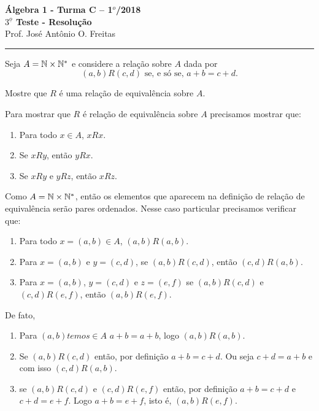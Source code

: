 \documentclass[12pt]{article}
\begin{document}


\begin{center}
{\Large\bf {\'A}lgebra 1 - Turma C -- 1$^{o}$/2018} \\ \vspace{9pt} {\large\bf
  $3^{\underline{o}}$ Teste - Resolu\c{c}\~ao}\\
\vspace{9pt} Prof. Jos{\'e} Ant{\^o}nio O. Freitas
\end{center}
\hrule

\vspace{.6cm}

\questao Seja $A = \mathbb{N} \times \mathbb{N}^*$ e considere a rela\c{c}\~ao sobre $A$ dada por
\[
	(a,b)R(c,d) \mbox{ se, e s\'o se, } a + b = c + d.
\]

Mostre que $R$ \'e uma rela\c{c}\~ao de equival\^encia sobre $A$.

Para mostrar que $R$ \'e rela\c{c}\~ao de equival\^encia sobre $A$ precisamos mostrar que:
\begin{enumerate}[label={\roman*})]
	\item Para todo $x \in A$, $xRx$.
	\item Se $xRy$, ent\~ao $yRx$.
	\item Se $xRy$ e $yRz$, ent\~ao $xRz$.
\end{enumerate}

Como $A = \mathbb{N} \times \mathbb{N}^*$, ent\~ao os elementos que aparecem na defini\c{c}\~ao de rela\c{c}\~ao de equival\^encia ser\~ao pares ordenados. Nesse caso particular precisamos verificar que:
\begin{enumerate}[label={\roman*})]
	\item Para todo $x = (a,b) \in A$, $(a,b)R(a,b)$.
	\item Para $x = (a,b)$ e $y = (c,d)$, se $(a,b)R(c,d)$, ent\~ao $(c,d)R(a,b)$.
	\item Para $x = (a,b)$, $y = (c,d)$ e $z = (e,f)$ se $(a,b)R(c,d)$ e $(c,d)R(e,f)$, ent\~ao $(a,b)R(e,f)$.
\end{enumerate}

De fato,
\begin{enumerate}[label={\roman*})]
	\item Para $(a,b) temos \in A$ $a + b = a + b$, logo $(a,b)R(a,b)$.
	\item Se $(a,b)R(c,d)$ ent\~ao, por defini\c{c}\~ao $a + b = c + d$. Ou seja $c + d = a + b$ e com isso $(c,d)R(a,b)$.
	\item se $(a,b)R(c,d)$ e $(c,d)R(e,f)$ ent\~ao, por defini\c{c}\~ao $a + b = c + d$  e $c + d = e + f$. Logo $a + b = e + f$, isto \'e, $(a,b)R(e,f)$.
\end{enumerate}
\end{document}
